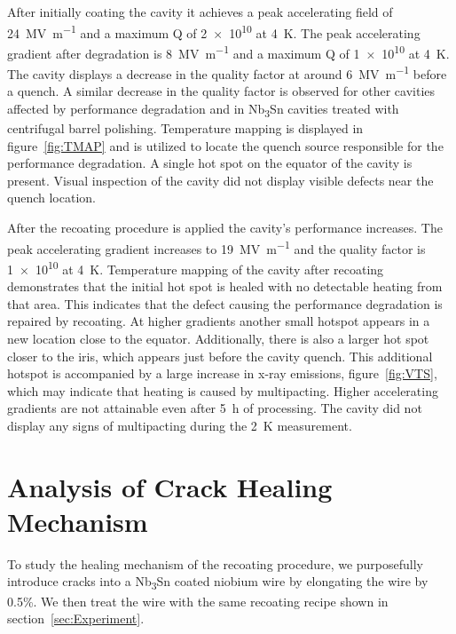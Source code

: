 After initially coating the cavity it achieves a peak accelerating field of \qty{24}{\mega\volt\per\meter} and a maximum Q of \num{2e10} at \qty{4}{\kelvin}. The peak accelerating gradient after degradation is \qty{8}{\mega\volt\per\meter} and a maximum Q of \num{1e10} at \qty{4}{\kelvin}. The cavity displays a decrease in the quality factor at around \qty{6}{\mega\volt\per\meter} before a quench. A similar decrease in the quality factor is observed for other cavities affected by performance degradation\cite{eremeev2023preservation,eremeev:srf2019-mop015} and in Nb\textsubscript{3}Sn cavities treated with centrifugal barrel polishing\cite{viklund2024improving}. Temperature mapping is displayed in figure~\ref{fig:TMAP} and is utilized to locate the quench source responsible for the performance degradation. A single hot spot on the equator of the cavity is present. Visual inspection of the cavity did not display visible defects near the quench location.

After the recoating procedure is applied the cavity's performance increases. The peak accelerating gradient increases to \qty{19}{\mega\volt\per\meter} and the quality factor is \num{1e10} at \qty{4}{\kelvin}. Temperature mapping of the cavity after recoating demonstrates that the initial hot spot is healed with no detectable heating from that area. This indicates that the defect causing the performance degradation is repaired by recoating. At higher gradients another small hotspot appears in a new location close to the equator. Additionally, there is also a larger hot spot closer to the iris, which appears just before the cavity quench. This additional hotspot is accompanied by a large increase in x-ray emissions, figure~\ref{fig:VTS}, which may indicate that heating is caused by multipacting. Higher accelerating gradients are not attainable even after \qty{5}{\hour} of processing. The cavity did not display any signs of multipacting during the \qty{2}{\kelvin} measurement.

\section{Analysis of Crack Healing Mechanism}

To study the healing mechanism of the recoating procedure, we purposefully introduce cracks into a Nb\textsubscript{3}Sn coated niobium wire by elongating the wire by 0.5\%. We then treat the wire with the same recoating recipe shown in section~\ref{sec:Experiment}.


